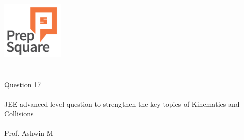 \documentclass{beamer}
\begin{document}
\begin{center}
\ \\ \ \\
\includegraphics[width=30mm]{Logo-final.png} \\
\ \\ \ \\ 
{\huge Question 17 \\ \ \\ }
{\Large
JEE advanced level question to strengthen the key topics of Kinematics and Collisions
}
{\large \ \\ \ \\ Prof. Ashwin M }
\end{center}
\end{document}

